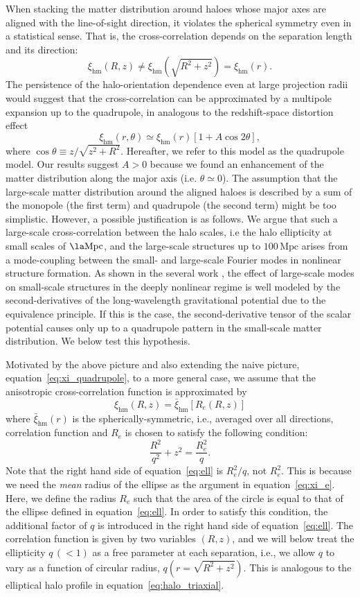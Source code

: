 \documentclass[a4paper,fleqn,usenatbib]{mnras}
\newcommand{\beq}{\begin{equation}}
\newcommand{\eeq}{\end{equation}}
\newcommand{\Mpc}{\mathrm{Mpc}}
\newcommand{\rmhm}{\mathrm{hm}}
\begin{document}
When stacking the matter distribution around haloes whose
major axes are aligned with the line-of-sight direction,
it violates the spherical symmetry even in a statistical sense.
That is, the cross-correlation depends on the separation length and its direction:
\beq
\xi_\rmhm (R, z) \ne \xi_\rmhm \left( \sqrt{R^2+z^2} \right) = \xi_\rmhm (r).
\eeq
The persistence of the halo-orientation dependence even at large projection radii would
suggest that the cross-correlation can be approximated by a multipole expansion up to the
quadrupole, in analogous to the redshift-space distortion effect
\beq
\xi_\rmhm (r, \theta) \simeq \xi_\rmhm (r)
\left[ 1 + A \cos 2\theta \right],
\label{eq:xi_quadrupole}
\eeq
where $\cos \theta \equiv z/\sqrt{z^2+R^2}$.
Hereafter, we refer to this model as the quadrupole model.
Our results suggest $A>0$ because we found an enhancement of
the matter distribution along the major axis (i.e. $\theta \simeq 0$).
The assumption that the large-scale matter distribution
around the aligned haloes is described by a sum of the monopole (the first term)
and quadrupole (the second term) might be too simplistic.
However, a possible justification is as follows.
We argue that such a large-scale cross-correlation
between the halo scales, i.e the halo ellipticity at small scales of $\la \Mpc$,
and the large-scale structures up to $100\,\Mpc$ arises from a mode-coupling
between the small- and large-scale Fourier modes in nonlinear structure formation.
As shown in the several work \citep[e.g.,][]{TakadaHu:13,AkitsuTakada:17},
the effect of large-scale modes on small-scale structures
in the deeply nonlinear regime is well modeled by the second-derivatives
of the long-wavelength gravitational potential due to the equivalence principle.
If this is the case, the second-derivative tensor of the scalar potential causes
only up to a quadrupole pattern in the small-scale matter distribution.
We below test this hypothesis.

Motivated by the above picture and also extending
the naive picture, equation~\eqref{eq:xi_quadrupole}, to a more general case,
we assume that the anisotropic cross-correlation function is approximated by
\beq
\xi_\rmhm (R, z) = \bar{\xi}_\rmhm [R_e(R, z)]
\label{eq:xi_e}
\eeq
where $\bar{\xi}_\rmhm (r)$ is the spherically-symmetric,
i.e., averaged over all directions, correlation function and
$R_e$ is chosen to satisfy the following condition:
\beq
\frac{R^2}{q^2} + z^2 = \frac{R_e^2}{q} .
\label{eq:ell}
\eeq
Note that the right hand side of equation~\eqref{eq:ell} is $R_e^2/q$, not $R_e^2$.
This is because we need the {\it mean} radius of the ellipse as the argument
in equation~\eqref{eq:xi_e}. Here, we define the radius $R_e$
such that the area of the circle is equal to
that of the ellipse defined in equation~\eqref{eq:ell}.
In order to satisfy this condition, the additional factor of $q$
is introduced in the right hand side of equation~\eqref{eq:ell}.
The correlation function is given by two variables $(R, z)$,
and we will below treat the ellipticity $q \, (<1)$ as a free parameter
at each separation, i.e., we allow $q$ to vary as a function of
circular radius, $q \left( r= \sqrt{R^2+z^2} \right)$.
This is analogous to the elliptical halo profile
in equation~\eqref{eq:halo_triaxial}.
\end{document}
